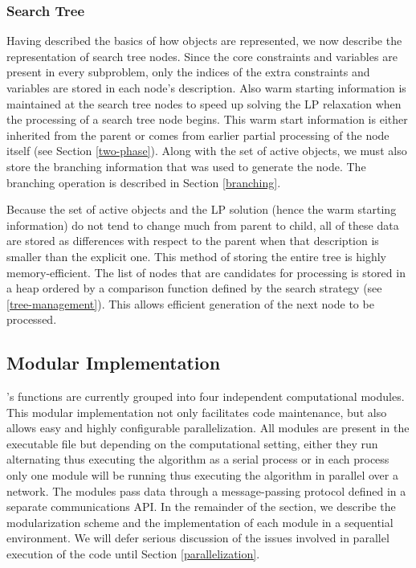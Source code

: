 
\subsubsection{Search Tree}

Having described the basics of how objects are represented, we now describe
the representation of search tree nodes. Since the core constraints and
variables are present in every subproblem, only the indices of the extra
constraints and variables are stored in each node's description. Also warm
starting information is maintained at the search tree nodes to speed up
solving the LP relaxation when the processing of a search tree node begins.
This warm start information is either inherited from the parent or comes from
earlier partial processing of the node itself (see Section \ref{two-phase}).
Along with the set of active objects, we must also store the branching
information that was used to generate the node. The branching operation is
described in Section \ref{branching}.

Because the set of active objects and the LP solution (hence the warm starting
information) do not tend to change much from parent to child, all of these
data are stored as differences with respect to the parent when that
description is smaller than the explicit one. This method of storing the
entire tree is highly memory-efficient. The list of nodes that are candidates
for processing is stored in a heap ordered by a comparison function defined by
the search strategy (see \ref{tree-management}). This allows efficient
generation of the next node to be processed.

\subsection{Modular Implementation}

\BB's functions are currently grouped into four independent computational
modules. This modular implementation not only facilitates code maintenance,
but also allows easy and highly configurable parallelization. All modules are
present in the executable file but depending on the computational setting,
either they run alternating thus executing the algorithm as a serial process
or in each process only one module will be running thus executing the
algorithm in parallel over a network. The modules pass data through a
message-passing protocol defined in a separate communications API. In the
remainder of the section, we describe the modularization scheme and the
implementation of each module in a sequential environment. We will defer
serious discussion of the issues involved in parallel execution of the code
until Section \ref{parallelization}.

